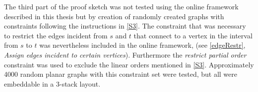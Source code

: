 The third part of the proof sketch was not tested using the online framework described in this thesis but by creation of randomly created graphs with constraints following the instructions in \autoref{S3}. The constraint that was necessary to restrict the edges incident from $s$ and $t$ that connect to a vertex in the interval from $s$ to $t$ was nevertheless included in the online framework, (see \autoref{edgeRestr}, \textit{Assign edges incident to certain vertices}). Furthermore the \textit{restrict partial order} constraint was used to exclude the linear orders mentioned in \autoref{S3}. Approximately 4000 random planar graphs with this constraint set  were tested, but all were embeddable in a 3-stack layout. 